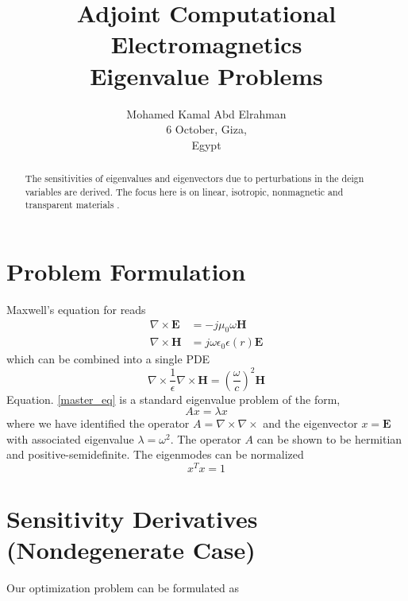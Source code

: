 \documentclass{tufte-handout}
\title{ Adjoint Computational Electromagnetics \\ 
Eigenvalue Problems	}
\author[mohamedkamal]{Mohamed Kamal Abd Elrahman \\
6 October, Giza,\\ Egypt}
\begin{document}
	\maketitle

\begin{abstract}
	The sensitivities of eigenvalues and eigenvectors due to perturbations in the deign variables are derived. The focus here is on linear, isotropic, nonmagnetic and transparent materials . 
\end{abstract}
 \section{Problem Formulation}
Maxwell's equation for  reads 
\begin{subequations}
	\begin{align}
	\nabla \times \mathbf{E}  &= -j \mu_0  \omega \mathbf{H}\\
	\nabla \times \mathbf{H}  &=   j \omega \epsilon_0 \epsilon(r) \mathbf{E}
	\end{align}
\end{subequations}
which can be combined into a single PDE  
\begin{equation}\label{master_eq}
\nabla \times \frac{1}{\epsilon} \nabla \times \mathbf{H}   = \left(  \frac{\omega}{c}\right)^2 \mathbf{H}
\end{equation}
Equation. \ref{master_eq} is a standard eigenvalue problem of the form,
\begin{equation}
A x = \lambda x
\end{equation}
where we have identified the operator $A = \nabla \times \nabla \times  $ and the eigenvector  $x = \mathbf{E}$ with associated eigenvalue $\lambda = \omega^2$. The operator $A$  can be shown to be hermitian and positive-semidefinite. The eigenmodes can be normalized
\begin{equation}
x^T x = 1
\end{equation}
\section{Sensitivity Derivatives (Nondegenerate Case)}
Our optimization problem can  be formulated as
\end{document}
